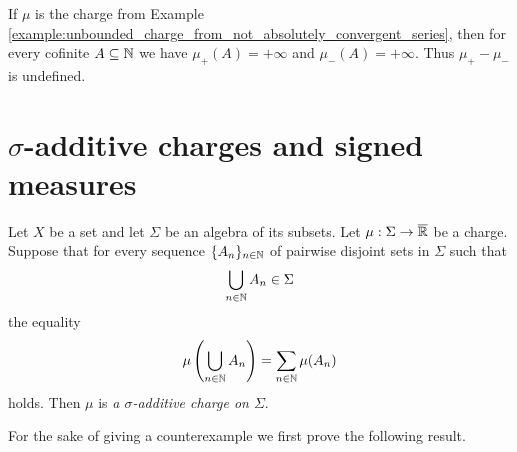 \begin{example}\label{example:charge_without_Jordan_decomposition}
    If $\mu$ is the charge from Example \ref{example:unbounded_charge_from_not_absolutely_convergent_series}, then for every cofinite $A \subseteq {\mathbb N}$ we have $\mu_+(A) = +\infty$ and $\mu_-(A) = +\infty$. Thus $\mu_+ - \mu_-$ is undefined.
\end{example}


\section{$\sigma$-additive charges and signed measures}

\begin{definition}
    Let $X$ be a set and let $\Sigma$ be an algebra of its subsets. Let $\mu:\Sigma \rightarrow \overline{{\mathbb R}}$ be a charge. Suppose that for every sequence $\{A_n\}_{n\in {\mathbb N}}$ of pairwise disjoint sets in $\Sigma$ such that
    $$\bigcup_{n\in {\mathbb N}}A_n \in \Sigma$$
    the equality
    $$\mu\left(\bigcup_{n\in {\mathbb N}}A_n\right) = \sum_{n \in {\mathbb N}}\mu(A_n)$$
    holds. Then $\mu$ is \textit{a $\sigma$-additive charge on $\Sigma$}.
\end{definition}
\noindent
For the sake of giving a counterexample we first prove the following result.

